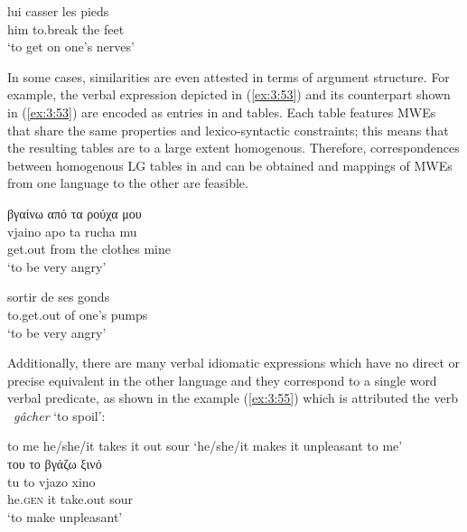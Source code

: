 \documentclass[output=paper]{langsci/langscibook}
\begin{document}
\begin{exe}
\ex \label{ex:3:52}
\gll lui casser les pieds \\
 him to.break the feet\\
\glt ‘to get on one’s nerves’
\end{exe}


In some cases, similarities are even attested in terms of argument
structure. For example, the\textit{ }\textit{\textup{}}
verbal expression depicted in (\ref{ex:3:53}) and its  counterpart shown in (\ref{ex:3:53}) 
are encoded as entries in  and  tables. Each table features MWEs
that share the same properties and lexico-syntactic constraints; this
means that the resulting tables are to a large extent homogenous.
Therefore, correspondences between homogenous LG tables in  and 
can be obtained and mappings of MWEs from one language to the other are
feasible.


\begin{exe}
\ex \label{ex:3:53}
\glll βγαίνω από τα ρούχα μου \\
vjaino apo ta rucha mu\\
get.out from the clothes mine\\
\glt %
‘to be very angry’
\end{exe}

\begin{exe}
\ex \label{ex:3:54}
\gll sortir de ses gonds\\
 to.get.out of one’s pumps\\
\glt ‘to be very angry’
\end{exe}

Additionally, there are many verbal idiomatic expressions which have no
direct or precise equivalent in the other language and they correspond
to a single word verbal predicate, as shown in the  example (\ref{ex:3:55})
which is attributed the  verb \ \textit{gâcher }‘to spoil’:

\begin{exe}
\ex \label{ex:3:55}
to me he/she/it takes it out sour `he/she/it makes it unpleasant to me'\\
\glll του το βγάζω ξινό \\
tu to vjazo xino \\
he.\textsc{gen} it take.out sour\\
\glt %
‘to make unpleasant’
\end{exe}
\end{document}
